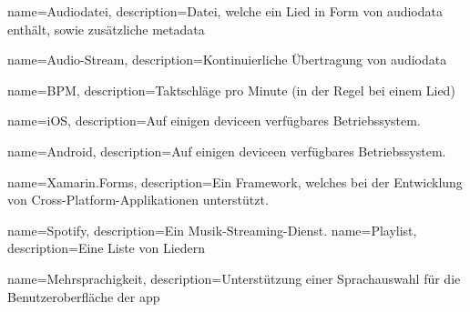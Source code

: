 {
	name=Audiodatei,
	description={Datei, welche ein Lied in Form von \Gls{audiodata} enthält, sowie zusätzliche \Gls{metadata}}
}

{
	name=Audio-Stream,
	description={Kontinuierliche Übertragung von \Gls{audiodata}}
}

{
	name=BPM,
	description={Taktschläge pro Minute (in der Regel bei einem Lied)}
}

{
	name=iOS,
	description={Auf einigen \Gls{device}en verfügbares Betriebssystem. }
}

{
	name=Android,
	description={Auf einigen \Gls{device}en verfügbares Betriebssystem. }
}

{
	name=Xamarin.Forms,
	description={Ein Framework, welches bei der Entwicklung von Cross-Platform-Applikationen unterstützt.
	}
}

{
	name=Spotify,
	description={Ein Musik-Streaming-Dienst. }
}
{
	name=Playlist,
	description={Eine Liste von Liedern}
}

{
	name=Mehrsprachigkeit,
	description={Unterstützung einer Sprachauswahl für die Benutzeroberfläche der \Gls{app}}
}
